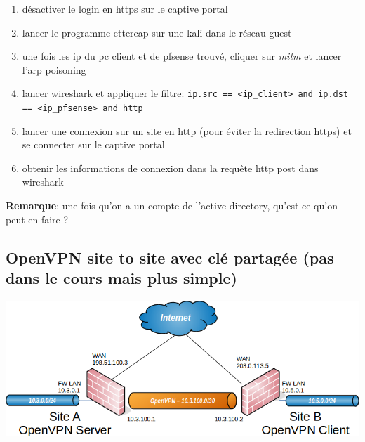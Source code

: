 \documentclass[a4paper]{article}
\begin{document}
\begin{enumerate}
    \item désactiver le login en https sur le captive portal
    \item lancer le programme ettercap sur une kali dans le réseau guest
    \item une fois les ip du pc client et de pfsense trouvé, cliquer sur \textit{mitm} et lancer l'arp poisoning
    \item lancer wireshark et appliquer le filtre: \texttt{ip.src == <ip\_client> and ip.dst == <ip\_pfsense> and http}
    \item lancer une connexion sur un site en http (pour éviter la redirection https) et se connecter sur le captive portal
    \item obtenir les informations de connexion dans la requête http post dans wireshark
\end{enumerate}
\textbf{Remarque}: une fois qu'on a un compte de l'active directory, qu'est-ce qu'on peut en faire ?










\subsection{OpenVPN site to site avec clé partagée (pas dans le cours mais plus simple)}





\begin{center} \includegraphics[width=0.99\linewidth]{images/openvpn-01.png} \end{center}
\end{document}
